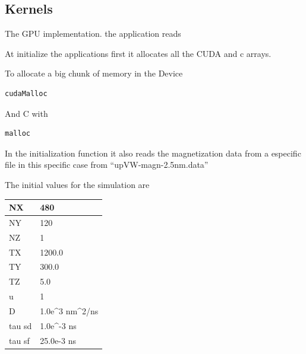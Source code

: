\cite{numerical}




\subsection{Kernels}

The GPU implementation. the application reads

At initialize the applications first it allocates all the CUDA and c arrays.

To allocate a big chunk of memory in the Device

\begin{lstlisting}[frame=none]
cudaMalloc
\end{lstlisting}
And C with

\begin{lstlisting}[frame=none]
malloc
\end{lstlisting}

In the initialization function it also reads the magnetization data from a especific file in this specific case from ``upVW-magn-2.5nm.data''


The initial values for the simulation are

\begin{table}[h]
\centering
\begin{tabular}{| l | l |}
\hline
NX     & 480                                            \\
\hline
NY     & 120                                            \\
\hline
NZ     & 1                                              \\
\hline
TX     & 1200.0                                         \\
\hline
TY     & 300.0                                          \\
\hline
TZ     & 5.0                                            \\
\hline
u      & 1                                              \\
\hline
D      & 1.0e\textasciicircum 3 nm\textasciicircum 2/ns \\
\hline
tau sd & 1.0e\textasciicircum -3 ns                     \\
\hline
tau sf & 25.0e-3 ns      \\
\hline
\end{tabular}
\end{table}


